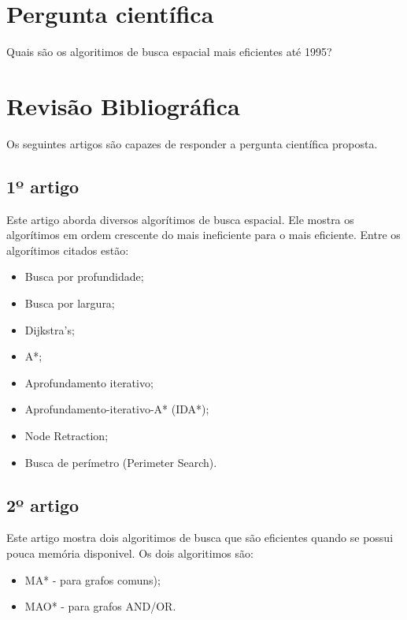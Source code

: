 \documentclass[a4paper]{article}
\begin{document}

\section{Pergunta científica}

Quais são os algoritimos de busca espacial mais eficientes até 1995?


\section{Revisão Bibliográfica}
Os seguintes artigos são capazes de responder a pergunta científica proposta.
\vspace{3mm}

\subsection{1º artigo}

Este artigo \citet{Korf1995} aborda diversos algorítimos de busca espacial. Ele mostra os algorítimos em ordem crescente do mais ineficiente para o mais eficiente. Entre os algorítimos citados estão:

\begin{itemize}

\item Busca por profundidade;
\item Busca por largura;
\item Dijkstra's;
\item A*;
\item Aprofundamento iterativo;
\item Aprofundamento-iterativo-A* (IDA*);
\item Node Retraction;
\item Busca de perímetro (Perimeter Search).

\end{itemize}

\subsection{2º artigo}

Este artigo \cite{Chakrabarti1989} mostra dois algoritimos de busca que são eficientes
quando se possui pouca memória disponivel. Os dois algoritimos são:

\begin{itemize}

\item MA* - para grafos comuns);
\item MAO* - para grafos AND/OR.

\end{itemize}
\end{document}
